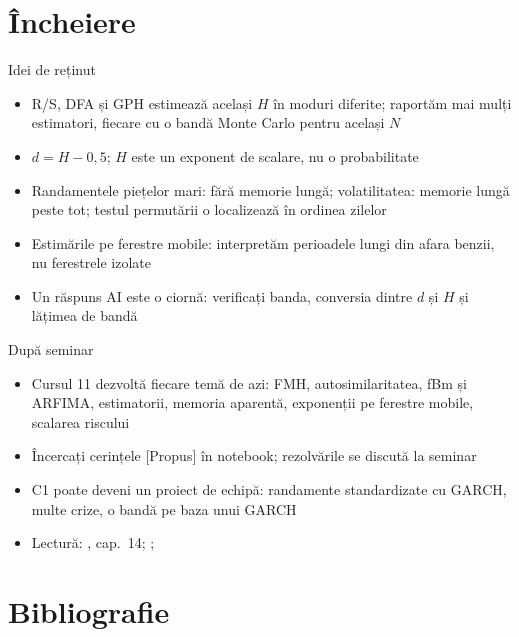\section{Încheiere}

\begin{frame}{Idei de reținut}
\itemsize{\small}
\begin{itemize}
    \item R/S, DFA și GPH estimează același $H$ în moduri diferite; raportăm mai mulți estimatori, fiecare cu o bandă Monte Carlo pentru același $N$
    \item $d = H - 0{,}5$; $H$ este un exponent de scalare, nu o probabilitate
    \item Randamentele piețelor mari: fără memorie lungă; volatilitatea: memorie lungă peste tot; testul permutării o localizează în ordinea zilelor
    \item Estimările pe ferestre mobile: interpretăm perioadele lungi din afara benzii, nu ferestrele izolate
    \item Un răspuns AI este o ciornă: verificați banda, conversia dintre $d$ și $H$ și lățimea de bandă
\end{itemize}
\end{frame}

\begin{frame}{După seminar}
\itemsize{\small}
\begin{itemize}
    \item Cursul 11 dezvoltă fiecare temă de azi: FMH, autosimilaritatea, fBm și ARFIMA, estimatorii, memoria aparentă, exponenții pe ferestre mobile, scalarea riscului
    \item Încercați cerințele [Propus] în notebook; rezolvările se discută la seminar
    \item C1 poate deveni un proiect de echipă: randamente standardizate cu GARCH, multe crize, o bandă pe baza unui GARCH
    \item Lectură: , cap.~14; ; 
\end{itemize}
\end{frame}


\section{Bibliografie}

